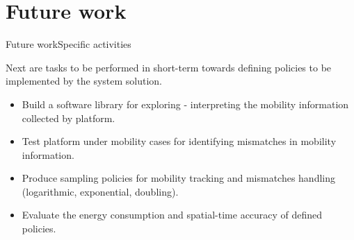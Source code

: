 \documentclass[8pt,xcolor={dvipsnames},handout]{beamer}
\begin{document}

\section{Future work}
\begin{frame}{Future work}{Specific activities}
{
Next are tasks to be performed in short-term towards defining policies to be implemented by the system solution.
\begin{itemize}
  \item Build a software library for exploring - interpreting the mobility information collected by platform.
  \item Test platform under mobility cases for identifying mismatches in mobility information.
  \item Produce sampling policies for mobility tracking and mismatches handling (logarithmic, exponential, doubling).
  \item Evaluate the energy consumption and spatial-time accuracy of defined policies.
\end{itemize}
}
\end{frame}
\end{document}
